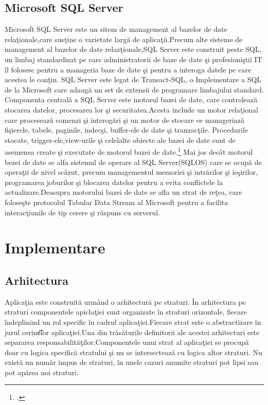 \documentclass[a4paper,12pt]{report}
\begin{document}
\section{Microsoft SQL Server}
Microsoft SQL Server este un sitem de management al bazelor de date rela\c tionale,care sus\c tine o varietate
larg\u a de aplica\c tii.Precum alte sisteme de management al bazelor de date relaz\c tionale,SQL Server
este construit peste SQL, un limbaj standardizat pe care administratorii de baze de date \c si profesioni\c stii IT
\^il folosesc pentru a manageria baze de date \c si pentru a interoga datele pe care acestea le con\c tin.
SQL Server este legat de Transact-SQL, o Implementare a SQL de la Microsoft care adaug\u a un set de extensii 
de programare limbajului standard.
Componenta central\u a a SQL Server este motorul bazei de date, care controleaz\u a stocarea datelor, procesarea lor
\c si securitatea.Acesta include un motor rela\c tional care proceseaz\u a comenzi \c si interog\u ari \c si 
un motor de stocare ce manageriaz\u a fi\c sierele, tabele, paginile, indec\c si, buffer-ele de date \c si tranzac\c tile.
Procedurile stocate, trigger-ele,view-urile \c si celelalte obiecte ale bazei de date sunt de asemenea create \c si executate 
de motorul bazei de date.\footcite{sqlServer}
Mai jos dec\^at motorul bezei de date se alfa sistemul de operare al SQL Server(SQLOS) care se ocup\u a
de opera\c tii de nivel sc\u azut, precum managementul memoriei \c si intr\u arilor \c si ie\c sirilor, programarea joburilor 
\c si blocarea datelor pentru a evita conflictele la actualizare.Deasupra motorului bazei de date se afla un strat de re\c tea,
care folose\c ste protocolul Tabular Data Stream al Microsoft pentru a facilita interac\c tiunile de tip cerere \c si r\u aspuns
cu serverul.

\chapter{Implementare}

\section{Arhitectura}

Aplica\c tia este construit\u a urm\^and o arhitectur\u a pe straturi.
\^In arhitectura pe straturi componentele apicla\c tiei sunt organizate \^in straturi orizontale,
fiecare \^indeplinind un rol specific \^in cadrul aplica\c tiei.Fiecare strat este o abstractizare 
 \^in jurul cerin\t elor aplica\c tiei.Una din tr\u as\u aturile definitorii ale acestei arhitecturi
este separarea responsabilit\u a\c tilor.Componentele unui strat al aplica\c tiei se procup\u a doar 
cu logica specific\u a stratului \c si nu se intersecteaz\u a cu logica altor straturi.
Nu exist\u a un num\u ar impus de straturi, \^in unele cazuri anumite straturi pot lipsi sau pot 
ap\u area noi straturi.
\end{document}
